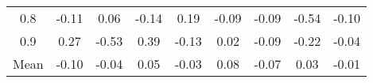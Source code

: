 \begin{longtable}{ | c || c | c | c | c | c | c | c || c |}
0.8 &  \cellcolor[HTML]{FFFFFF} -0.11 &  \cellcolor[HTML]{FFFFFF} 0.06 &  \cellcolor[HTML]{FFFFFF} -0.14 &  \cellcolor[HTML]{F7F7FF} 0.19 &  \cellcolor[HTML]{FFFFFF} -0.09 &  \cellcolor[HTML]{FFFFFF} -0.09 &  \cellcolor[HTML]{FFEFEF} -0.54 &  \cellcolor[HTML]{FFFFFF} -0.10 \\
0.9 &  \cellcolor[HTML]{F7F7FF} 0.27 &  \cellcolor[HTML]{FFEFEF} -0.53 &  \cellcolor[HTML]{F7F7FF} 0.39 &  \cellcolor[HTML]{FFFFFF} -0.13 &  \cellcolor[HTML]{FFFFFF} 0.02 &  \cellcolor[HTML]{FFFFFF} -0.09 &  \cellcolor[HTML]{FFF7F7} -0.22 &  \cellcolor[HTML]{FFFFFF} -0.04 \\
\hline
\hline
Mean  &  \cellcolor[HTML]{FFFFFF} -0.10 &  \cellcolor[HTML]{FFFFFF} -0.04 &  \cellcolor[HTML]{FFFFFF} 0.05 &  \cellcolor[HTML]{FFFFFF} -0.03 &  \cellcolor[HTML]{FFFFFF} 0.08 &  \cellcolor[HTML]{FFFFFF} -0.07 &  \cellcolor[HTML]{FFFFFF} 0.03 &  \cellcolor[HTML]{FFFFFF} -0.01 \\
\hline
\end{longtable}
